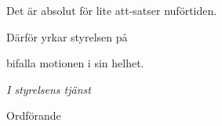 \documentclass[../main/handlingar.tex]{subfiles}
\begin{document}
\motionssvar

Det är absolut för lite att-satser nuförtiden.

Därför yrkar styrelsen på
\begin{attsatser}
    \att bifalla motionen i sin helhet.
\end{attsatser}

\begin{signatures}{1}
    \emph{I styrelsens tjänst}
    \signature{\ordf}{Ordförande}
\end{signatures}
\end{document}
